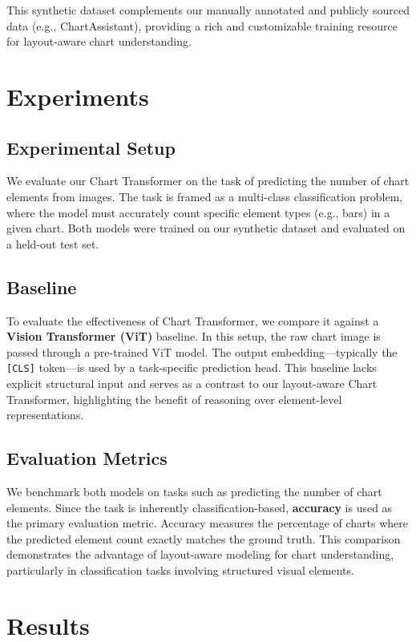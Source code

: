 \documentclass[11pt]{article}
\begin{document}
This synthetic dataset complements our manually annotated and publicly sourced data (e.g., ChartAssistant), providing a rich and customizable training resource for layout-aware chart understanding.


\section{Experiments}

\subsection*{Experimental Setup}

We evaluate our Chart Transformer on the task of predicting the number of chart elements from images. The task is framed as a multi-class classification problem, where the model must accurately count specific element types (e.g., bars) in a given chart. Both models were trained on our synthetic dataset and evaluated on a held-out test set.

\subsection*{Baseline}

To evaluate the effectiveness of Chart Transformer, we compare it against a \textbf{Vision Transformer (ViT)} baseline. In this setup, the raw chart image is passed through a pre-trained ViT model. The output embedding—typically the \texttt{[CLS]} token—is used by a task-specific prediction head. This baseline lacks explicit structural input and serves as a contrast to our layout-aware Chart Transformer, highlighting the benefit of reasoning over element-level representations.

\subsection*{Evaluation Metrics}

We benchmark both models on tasks such as predicting the number of chart elements. Since the task is inherently classification-based, \textbf{accuracy} is used as the primary evaluation metric. Accuracy measures the percentage of charts where the predicted element count exactly matches the ground truth. This comparison demonstrates the advantage of layout-aware modeling for chart understanding, particularly in classification tasks involving structured visual elements.


\section{Results}
\end{document}

